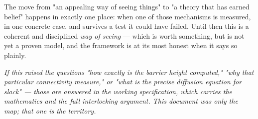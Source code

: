 \documentclass{article}
\begin{document}
The move from "an appealing way of seeing things" to "a theory that has earned belief" happens in exactly one place: when one of those mechanisms is measured, in one concrete case, and survives a test it could have failed. Until then this is a coherent and disciplined \textit{way of seeing} --- which is worth something, but is not yet a proven model, and the framework is at its most honest when it says so plainly.

\hr

\textit{If this raised the questions "how exactly is the barrier height computed," "why that particular connectivity measure," or "what is the precise diffusion equation for slack" --- those are answered in the working specification, which carries the mathematics and the full interlocking argument. This document was only the map; that one is the territory.}
\end{document}
